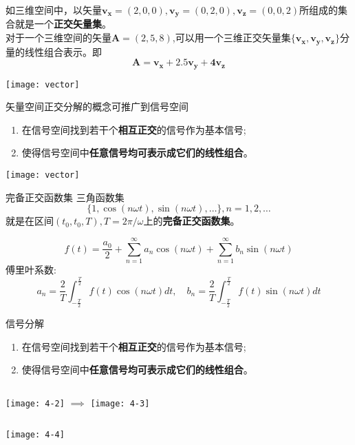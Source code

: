 \begin{frame}
\begin{example}
如三维空间中，以矢量$\bm{v_x}=(2,0,0),\bm{v_y}=(0,2,0),\bm{v_z}=(0,0,2)$所组成的集合就是一个\textbf{正交矢量集}。\\
对于一个三维空间的矢量$\bm{A}=(2,5,8)$,可以用一个三维正交矢量集$\{\bm{v_x,v_y,v_z}\}$分量的线性组合表示。即
\[\bm{A=v_x+2.5v_y+4v_z} \]
\end{example}
\centering
\texttt{[image: vector]}
\end{frame}

\begin{frame}{矢量空间正交分解的概念可推广到信号空间}
\begin{enumerate}
	\setlength{\itemsep}{.3cm}
	\item 在信号空间找到若干个\textbf{相互正交}的信号作为基本信号; 
	\item 使得信号空间中\textbf{任意信号均可表示成它们的线性组合}。
\end{enumerate}
\centering
\texttt{[image: vector]}
\end{frame}

\begin{frame}{完备正交函数集}
三角函数集
\[ \{1,\cos(n\omega t),\sin(n\omega t),\dots\},n=1,2,\dots \]
就是在区间$(t_0,t_0,T),T=2\pi/\omega$上的\textbf{完备正交函数集}。
\begin{example}[傅里叶级数的三角形式]
\[ f(t)=\frac{a_0}{2}+\sum\limits_{n=1}^{\infty}a_n\cos(n\omega t)+\sum\limits_{n=1}^{\infty}b_n\sin(n\omega t)\]
傅里叶系数: 
\[ a_n=\frac{2}{T}\int_{-\frac{T}{2}}^{\frac{T}{2}}f(t)\cos(n\omega t)dt,\quad b_n=\frac{2}{T}\int_{-\frac{T}{2}}^{\frac{T}{2}}f(t)\sin(n\omega t)dt \]
\end{example}
\end{frame}

\begin{frame}{信号分解}
\begin{enumerate}
	\setlength{\itemsep}{.2cm}
	\item 在信号空间找到若干个\textbf{相互正交}的信号作为基本信号; 
	\item 使得信号空间中\textbf{任意信号均可表示成它们的线性组合}。
\end{enumerate}
\begin{columns}
	\texttt{[image: 4-2]}
	\hspace{1cm}$\implies$
	\texttt{[image: 4-3]}
\end{columns}
\texttt{[image: 4-4]}
\end{frame}

